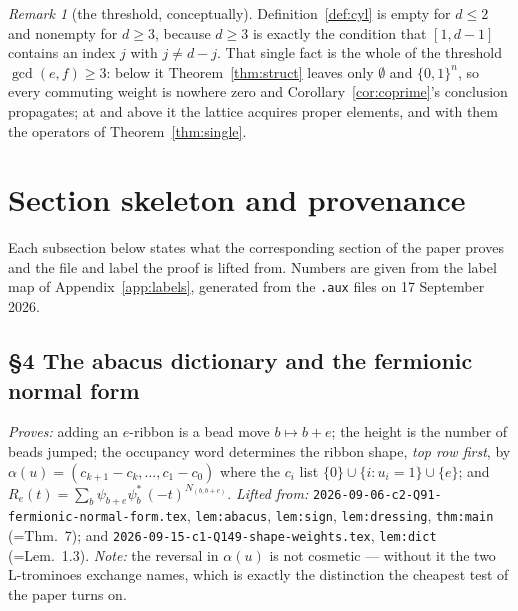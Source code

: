 \documentclass[11pt]{article}
\theoremstyle{definition}
\theoremstyle{remark}
\newtheorem{remark}[theorem]{Remark}
\newcommand{\cube}{\{0,1\}}
\begin{document}
\begin{remark}[the threshold, conceptually]\label{rem:threshold}
Definition~\ref{def:cyl} is empty for $d\le2$ and nonempty for $d\ge3$, because
$d\ge3$ is exactly the condition that $[1,d-1]$ contains an index $j$ with $j\ne d-j$.  That
single fact is the whole of the threshold $\gcd(e,f)\ge3$: below it
Theorem~\ref{thm:struct} leaves only $\emptyset$ and $\cube^{n}$, so every commuting weight is
nowhere zero and Corollary~\ref{cor:coprime}'s conclusion propagates; at and above it the
lattice acquires proper elements, and with them the operators of
Theorem~\ref{thm:single}.
\end{remark}

\section{Section skeleton and provenance}\label{sec:skeleton}

Each subsection below states what the corresponding section of the paper proves and the
file and label the proof is lifted from.  Numbers are given from the label map of
Appendix~\ref{app:labels}, generated from the \texttt{.aux} files on 17 September 2026.

\subsection*{\S4 The abacus dictionary and the fermionic normal form}
\emph{Proves:} adding an $e$-ribbon is a bead move $b\mapsto b+e$; the height is the number of
beads jumped; the occupancy word determines the ribbon shape, \emph{top row first}, by
$\alpha(u)=(c_{k+1}-c_k,\dots,c_1-c_0)$ where the $c_i$ list $\{0\}\cup\{i:u_i=1\}\cup\{e\}$;
and $R_e(t)=\sum_b\psi_{b+e}\psi^*_b\,(-t)^{N_{(b,b+e)}}$.
\emph{Lifted from:} \texttt{2026-09-06-c2-Q91-fermionic-normal-form.tex},
\texttt{lem:abacus}, \texttt{lem:sign}, \texttt{lem:dressing},
\texttt{thm:main} (=Thm.~7); and \texttt{2026-09-15-c1-Q149-shape-weights.tex},
\texttt{lem:dict} (=Lem.~1.3).
\emph{Note:} the reversal in $\alpha(u)$ is not cosmetic --- without it the two L-trominoes
exchange names, which is exactly the distinction the cheapest test of the paper turns on.
\end{document}
